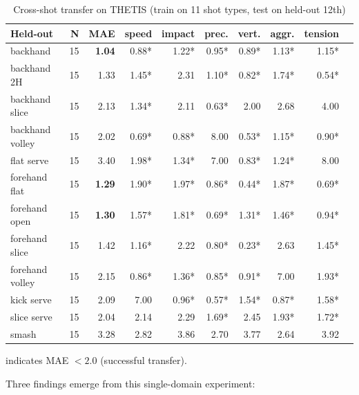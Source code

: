 \documentclass[11pt]{article}
\begin{document}
\begin{table}[ht]
\centering
\caption{Cross-shot transfer on THETIS (train on 11 shot types, test on held-out 12th)}
\begin{tabular}{lrrrrrrrrr}
\toprule
Held-out & N & MAE & speed & impact & prec. & vert. & aggr. & tension \\
\midrule
backhand & 15 & \textbf{1.04} & 0.88* & 1.22* & 0.95* & 0.89* & 1.13* & 1.15* \\
backhand 2H & 15 & 1.33 & 1.45* & 2.31 & 1.10* & 0.82* & 1.74* & 0.54* \\
backhand slice & 15 & 2.13 & 1.34* & 2.11 & 0.63* & 2.00 & 2.68 & 4.00 \\
backhand volley & 15 & 2.02 & 0.69* & 0.88* & 8.00 & 0.53* & 1.15* & 0.90* \\
flat serve & 15 & 3.40 & 1.98* & 1.34* & 7.00 & 0.83* & 1.24* & 8.00 \\
forehand flat & 15 & \textbf{1.29} & 1.90* & 1.97* & 0.86* & 0.44* & 1.87* & 0.69* \\
forehand open & 15 & \textbf{1.30} & 1.57* & 1.81* & 0.69* & 1.31* & 1.46* & 0.94* \\
forehand slice & 15 & 1.42 & 1.16* & 2.22 & 0.80* & 0.23* & 2.63 & 1.45* \\
forehand volley & 15 & 2.15 & 0.86* & 1.36* & 0.85* & 0.91* & 7.00 & 1.93* \\
kick serve & 15 & 2.09 & 7.00 & 0.96* & 0.57* & 1.54* & 0.87* & 1.58* \\
slice serve & 15 & 2.04 & 2.14 & 2.29 & 1.69* & 2.45 & 1.93* & 1.72* \\
smash & 15 & 3.28 & 2.82 & 3.86 & 2.70 & 3.77 & 2.64 & 3.92 \\
\bottomrule
\end{tabular}
\label{tab:tennis_transfer}
\end{table}

\noindent * indicates MAE $< 2.0$ (successful transfer).

Three findings emerge from this single-domain experiment:
\end{document}
